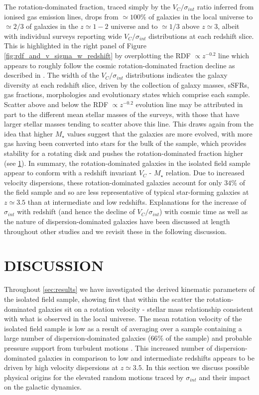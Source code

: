 \documentclass[fleqn,usenatbib]{mnras}
\begin{document}
\noindent
The rotation-dominated fraction, traced simply by the $V_{C}/\sigma_{int}$ ratio inferred from ionised gas emission lines, drops from $\simeq100\%$ of galaxies in the local universe to $\simeq2/3$ of galaxies in the $z\simeq1-2$ universe and to $\simeq1/3$ above $z\simeq3$, albeit with individual surveys reporting wide $V_{C}/\sigma_{int}$ distributions at each redshift slice.
This is highlighted in the right panel of Figure \ref{fig:rdf_and_v_sigma_w_redshift} by overplotting the RDF $\propto z^{-0.2}$ line which appears to roughly follow the cosmic rotation-dominated fraction decline as described in \cite{Stott2016}. 
The width of the $V_{C}/\sigma_{int}$ distributions indicates the galaxy diversity at each redshift slice, driven by the collection of galaxy masses, sSFRs, gas fractions, morphologies and evolutionary states which comprise each sample.
Scatter above and below the RDF $\propto z^{-0.2}$ evolution line may be attributed in part to the different mean stellar masses of the surveys, with those that have larger stellar masses tending to scatter above this line.
This draws again from the idea that higher $M_{\star}$ values suggest that the galaxies are more evolved, with more gas having been converted into stars for the bulk of the sample, which provides stability for a rotating disk and pushes the rotation-dominated fraction higher (see \cref{sec:discussion}).
In summary, the rotation-dominated galaxies in the isolated field sample appear to conform with a redshift invariant $V_{C}$ - $M_{\star}$ relation.
Due to increased velocity dispersions, these rotation-dominated galaxies account for only $34\%$ of the field sample and so are less representative of typical star-forming galaxies at $z\simeq3.5$ than at intermediate and low redshifts. 
Explanations for the increase of $\sigma_{int}$ with redshift (and hence the decline of $V_{C}/\sigma_{int}$) with cosmic time as well as the nature of dispersion-dominated galaxies have been discussed at length throughout other studies \citep[e.g][]{ForsterSchreiber2009,Law2009,Burkert2010,Newman2013,Wisnioski2015} and we revisit these in the following discussion.

\section{DISCUSSION}\label{sec:discussion}

Throughout \cref{sec:results} we have investigated the derived kinematic parameters of the isolated field sample, showing first that within the scatter the rotation-dominated galaxies sit on a rotation velocity - stellar mass relationship consistent with what is observed in the local universe.
The mean rotation velocity of the isolated field sample is low as a result of averaging over a sample containing a large number of dispersion-dominated galaxies ($66\%$ of the sample) and probable pressure support from turbulent motions \citep[e.g.][]{Burkert2010}.
This increased number of dispersion-dominated galaxies in comparison to low and intermediate redshifts appears to be driven by high velocity dispersions at $z\simeq3.5$.
In this section we discuss possible physical origins for the elevated random motions traced by $\sigma_{int}$ and their impact on the galactic dynamics.
\end{document}
